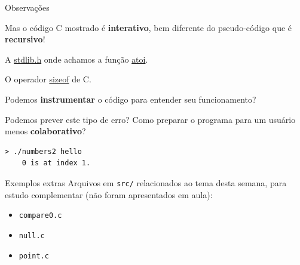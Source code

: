 \documentclass{beamer}
\begin{document}
\begin{frame}{Observações}

  Mas o código C mostrado é \textbf{interativo}, bem diferente do
  pseudo-código que é \textbf{recursivo}!

  A
  \href{https://man7.org/linux/man-pages/man0/stdlib.h.0p.html}{stdlib.h}
  onde achamos a função
  \href{https://man7.org/linux/man-pages/man3/atoi.3p.html}{atoi}.

  O operador \href{https://en.wikipedia.org/wiki/Sizeof}{sizeof} de C.

  Podemos \textbf{instrumentar} o código para entender seu funcionamento?

  \framebreak

  Podemos prever este tipo de erro? Como preparar o programa para um
  usuário menos \textbf{colaborativo}?

  \vspace{1cm}
  
  \begin{lstlisting}[basicstyle=\ttfamily]
    > ./numbers2 hello
    0 is at index 1.
  \end{lstlisting}

\end{frame}


\begin{frame}{Exemplos extras}
  Arquivos em \texttt{src/} relacionados ao tema desta semana, para
  estudo complementar (não foram apresentados em aula):
  \begin{itemize}
    \item \texttt{compare0.c}
    \item \texttt{null.c}
    \item \texttt{point.c}
  \end{itemize}
\end{frame}
\end{document}

